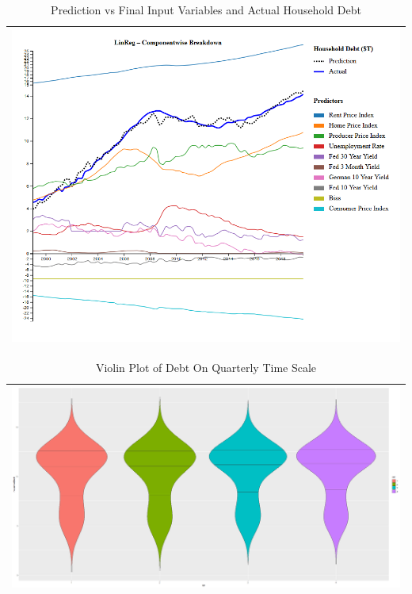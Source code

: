 \documentclass[sigconf,nonacm,11pt]{acmart}
\begin{document}
\begin{appendix}
\begin{table}[ht]
\caption{Prediction vs Final Input Variables and Actual Household Debt}
\centering
\begin{tabular}{p{1.0\linewidth}}
\hline
\includegraphics[scale = 0.27]{linreg.png}\\
\hline
\end{tabular}
\end{table}


\begin{table}[ht]
\caption{Violin Plot of Debt On Quarterly Time Scale}
\centering
\begin{tabular}{p{1.0\linewidth}}
\hline
\includegraphics[scale = 0.26]{QtrVSHouseholdDebt_violinPlot.png}\\
\hline
\end{tabular}
\end{table}


\end{appendix}
\end{document}
